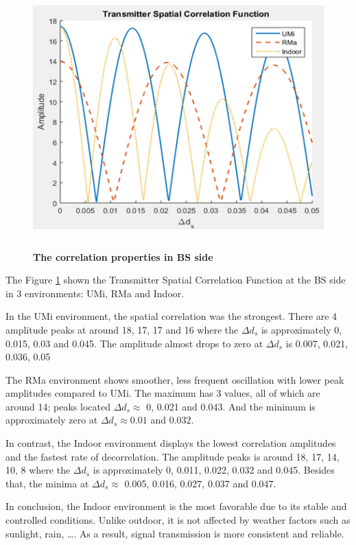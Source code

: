 \documentclass{article} %
\begin{document}
\setcounter{section}{1}
\setcounter{figure}{0}
\begin{figure}[!ht]
    \centering
    \includegraphics[height=10cm]{Images/figrue2.png}
    \caption[The correlation properties in BS side]{\bfseries \fontsize{12pt}{0pt}\selectfont The correlation properties in BS side}
    \label{figure2}
\end{figure}

The Figure \ref{figure2} shown the Transmitter Spatial Correlation Function at the BS side in 3 environments: UMi, RMa and Indoor. 

In the UMi environment, the spatial correlation was the strongest. There are 4 amplitude peaks at around 18, 17, 17 and 16 where the $\Delta d_s$ is approximately 0, 0.015, 0.03 and 0.045. The amplitude almost drops to zero at $\Delta d_s$ is 0.007, 0.021, 0.036, 0.05

The RMa environment shows smoother, less frequent oscillation with lower peak amplitudes compared to UMi. The maximum has 3 values, all of which are around 14; peaks located $\Delta d_s \approx$ 0, 0.021 and 0.043. And the minimum is approximately zero at $\Delta d_s \approx 0.01$ and $0.032$.

In contrast, the Indoor environment displays the lowest correlation amplitudes and the fastest rate of decorrelation. The amplitude peaks is around 18, 17, 14, 10, 8 where the $\Delta d_s$ is approximately 0, 0.011, 0.022, 0.032 and 0.045. Besides that, the minima at $\Delta d_s \approx$ 0.005, 0.016, 0.027, 0.037 and 0.047.

In conclusion, the Indoor environment is the most favorable due to its stable and controlled conditions. Unlike outdoor, it is not affected by weather factors such as sunlight, rain, \dots. As a result, signal transmission is more consistent and reliable.
\end{document}
